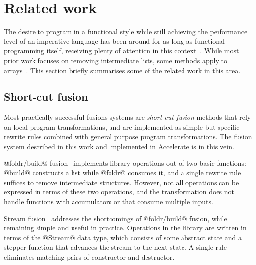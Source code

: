 \section{Related work}
\label{sec:fusion_related_work}

The desire to program in a functional style while still achieving the
performance level of an imperative language has been around for as long as
functional programming itself, receiving plenty of attention in this
context~\cite{Coutts:2007kp,Gill:1993de,Hu:1997tk,Meijer:1991,Rompf:2013er,Takano:1995,Wadler:1984ia,Waters:1991fp}.
While most prior work focuses on removing intermediate lists, some methods apply
to arrays~\cite{Chakravarty:2001dt,Claessen:2012hl,Grelck:2006ci,Keller:2010er}.
This section briefly summarises some of the related work in this area.


\subsection{Short-cut fusion}

Most practically successful fusions systems are \emph{short-cut fusion}
 methods that rely on local program transformations, and
are implemented as simple but specific rewrite rules combined with general
purpose program transformations. The fusion system described in this work and
implemented in Accelerate is in this vein.


@foldr/build@ fusion~\cite{Gill:1996tf,Gill:1993de}
implements library operations out of two basic functions: @build@
constructs a list while @foldr@ consumes it, and a single rewrite rule suffices
to remove intermediate structures. However, not all operations can be expressed
in terms of these two operations, and the transformation does not handle
functions with accumulators or that consume multiple inputs.

Stream fusion~\cite{Coutts:2007kp} addresses the
shortcomings of @foldr/build@ fusion, while remaining simple and useful in
practice. Operations in the library are written in terms of the @Stream@ data
type, which consists of some abstract state and a stepper function that advances
the stream to the next state. A single rule eliminates matching pairs of
constructor and destructor.

